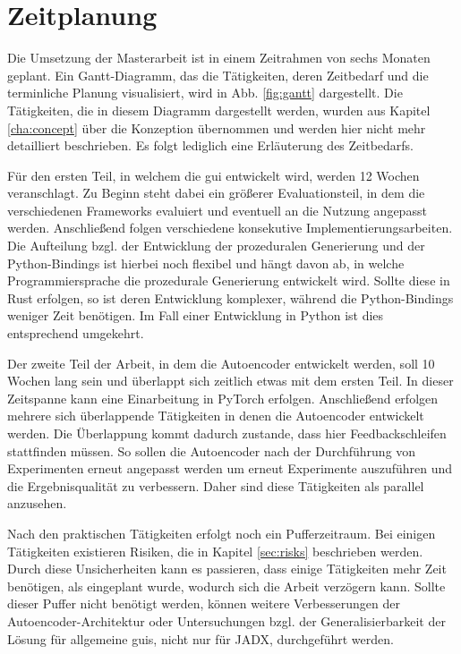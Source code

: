 \chapter{Zeitplanung}
Die Umsetzung der Masterarbeit ist in einem Zeitrahmen von sechs Monaten geplant. Ein Gantt-Diagramm, das die Tätigkeiten, deren Zeitbedarf und die terminliche Planung visualisiert, wird in Abb. \ref{fig:gantt} dargestellt.
Die Tätigkeiten, die in diesem Diagramm dargestellt werden, wurden aus Kapitel \ref{cha:concept} über die Konzeption übernommen und werden hier nicht mehr detailliert beschrieben. Es folgt lediglich eine Erläuterung des Zeitbedarfs.

Für den ersten Teil, in welchem die \gls{gui} entwickelt wird, werden 12 Wochen veranschlagt. Zu Beginn steht dabei ein größerer Evaluationsteil, in dem die verschiedenen Frameworks evaluiert und eventuell an die Nutzung angepasst werden. Anschließend folgen verschiedene konsekutive Implementierungsarbeiten. Die Aufteilung bzgl. der Entwicklung der prozeduralen Generierung und der Python-Bindings ist hierbei noch flexibel und hängt davon ab, in welche Programmiersprache die prozedurale Generierung entwickelt wird. Sollte diese in Rust erfolgen, so ist deren Entwicklung komplexer, während die Python-Bindings weniger Zeit benötigen. Im Fall einer Entwicklung in Python ist dies entsprechend umgekehrt.

Der zweite Teil der Arbeit, in dem die Autoencoder entwickelt werden, soll 10 Wochen lang sein und überlappt sich zeitlich etwas mit dem ersten Teil. In dieser Zeitspanne kann eine Einarbeitung in PyTorch erfolgen. Anschließend erfolgen mehrere sich überlappende Tätigkeiten in denen die Autoencoder entwickelt werden. Die Überlappung kommt dadurch zustande, dass hier Feedbackschleifen stattfinden müssen. So sollen die Autoencoder nach der Durchführung von Experimenten erneut angepasst werden um erneut Experimente auszuführen und die Ergebnisqualität zu verbessern. Daher sind diese Tätigkeiten als parallel anzusehen.

Nach den praktischen Tätigkeiten erfolgt noch ein Pufferzeitraum. Bei einigen Tätigkeiten existieren Risiken, die in Kapitel \ref{sec:risks} beschrieben werden. Durch diese Unsicherheiten kann es passieren, dass einige Tätigkeiten mehr Zeit benötigen, als eingeplant wurde, wodurch sich die Arbeit verzögern kann. Sollte dieser Puffer nicht benötigt werden, können weitere Verbesserungen der Autoencoder-Architektur oder Untersuchungen bzgl. der Generalisierbarkeit der Lösung für allgemeine \glspl{gui}, nicht nur für JADX, durchgeführt werden.

